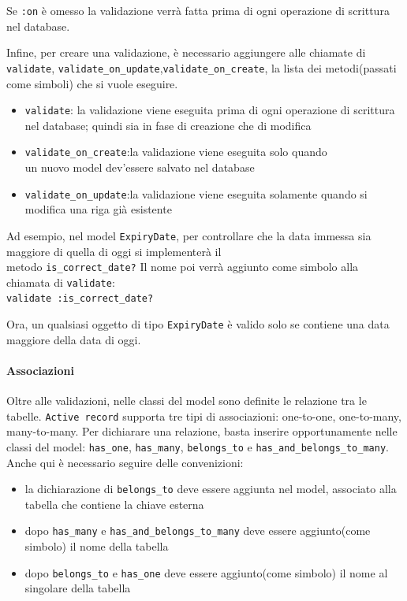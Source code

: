 \documentclass[11pt,a4paper]{article}
\begin{document}
 
Se \verb|:on| è omesso la validazione verrà fatta prima di ogni operazione di scrittura nel database.


Infine, per creare una validazione, è necessario aggiungere alle chiamate di \verb|validate|, \verb|validate_on_update|,\verb|validate_on_create|, la lista dei metodi(passati come simboli) che si vuole eseguire.
\begin{itemize}
 \item \verb|validate|: la validazione viene eseguita prima di ogni operazione di scrittura nel database; quindi sia in fase di creazione che di modifica
 \item \verb|validate_on_create|:la validazione viene eseguita solo quando\\ un nuovo model dev'essere salvato nel database
 \item \verb|validate_on_update|:la validazione viene eseguita solamente quando si modifica una riga già esistente
\end{itemize}


Ad esempio, nel model \verb|ExpiryDate|, per controllare che la data immessa sia maggiore di quella di oggi si implementerà il \\metodo \verb|is_correct_date?|
Il nome poi verrà aggiunto come simbolo alla chiamata di \verb|validate|:\\
\verb|validate :is_correct_date?|


Ora, un qualsiasi oggetto di tipo \verb|ExpiryDate| è valido solo se contiene una data maggiore della data di oggi.
\paragraph{Associazioni}
Oltre alle validazioni, nelle classi del model sono definite le relazione tra le tabelle.
\verb|Active record| supporta tre tipi di associazioni: one-to-one, one-to-many, many-to-many.
Per dichiarare una relazione, basta inserire opportunamente nelle classi del model: \verb|has_one|, \verb|has_many|, \verb|belongs_to| e \verb|has_and_belongs_to_many|.
Anche qui è necessario seguire delle convenizioni:
\begin{itemize}
 \item la dichiarazione di \verb|belongs_to| deve essere aggiunta nel model, associato alla tabella che contiene la chiave esterna
 \item dopo \verb|has_many| e \verb|has_and_belongs_to_many| deve essere aggiunto(come simbolo) il nome della tabella
 \item dopo \verb|belongs_to| e \verb|has_one| deve essere aggiunto(come simbolo) il nome al singolare della tabella
\end{itemize}
\end{document}
